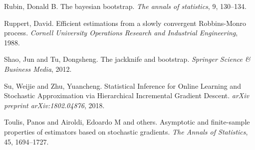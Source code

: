 \documentclass[twoside,11pt]{article}
\begin{document}
\begin{thebibliography}{99}
 {Rubin, Donald B}. The bayesian bootstrap. {\it The annals of statistics}, {9}, 130--134.

 {Ruppert, David}. Efficient estimations from a slowly convergent Robbins-Monro process. {\it Cornell University Operations Research and Industrial Engineering}, 1988.

 {Shao, Jun and Tu, Dongsheng}. The jackknife and bootstrap. {\it Springer Science \& Business Media}, 2012.

 {Su, Weijie and Zhu, Yuancheng}. Statistical Inference for Online Learning and Stochastic Approximation via Hierarchical Incremental Gradient Descent. {\it arXiv preprint arXiv:1802.04876}, 2018.

 {Toulis, Panos and Airoldi, Edoardo M and others}. Asymptotic and finite-sample properties of estimators based on stochastic gradients. {\it The Annals of Statistics}, {45}, 1694--1727.


\end{thebibliography}
\end{document}
